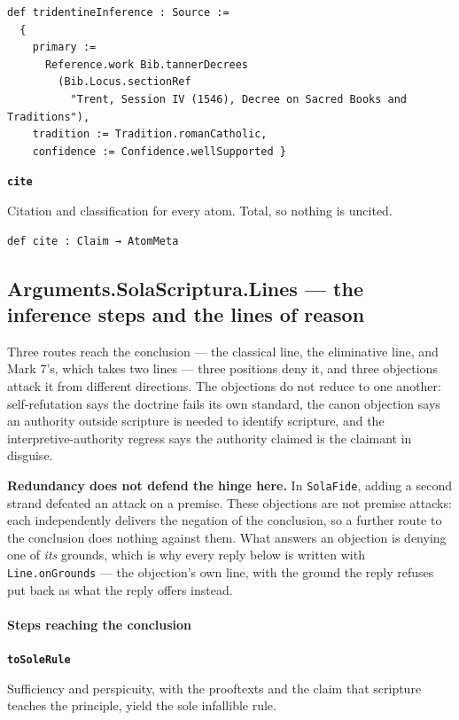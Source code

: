\documentclass[11pt]{article}
\begin{document}
{\small\begin{verbatim}
def tridentineInference : Source :=
  {
    primary :=
      Reference.work Bib.tannerDecrees
        (Bib.Locus.sectionRef
          "Trent, Session IV (1546), Decree on Sacred Books and Traditions"),
    tradition := Tradition.romanCatholic,
    confidence := Confidence.wellSupported }
\end{verbatim}}
\par\medskip\noindent\textbf{\texttt{cite}}\par\nobreak\noindent
Citation and classification for every atom. Total, so nothing is uncited.

{\small\begin{verbatim}
def cite : Claim → AtomMeta
\end{verbatim}}
\subsection*{Arguments.SolaScriptura.Lines — the inference steps and the lines of reason}
Three routes reach the conclusion — the classical line, the eliminative line, and Mark 7's, which takes two lines — three positions deny it, and three objections attack it from different directions. The objections do not reduce to one another: self-refutation says the doctrine fails its own standard, the canon objection says an authority outside scripture is needed to identify scripture, and the interpretive-authority regress says the authority claimed is the claimant in disguise.

\textbf{Redundancy does not defend the hinge here.} In \texttt{Sola\allowbreak{}Fide}, adding a second strand defeated an attack on a premise. These objections are not premise attacks: each independently delivers the negation of the conclusion, so a further route to the conclusion does nothing against them. What answers an objection is denying one of \emph{its} grounds, which is why every reply below is written with \texttt{Line.on\allowbreak{}Grounds} — the objection's own line, with the ground the reply refuses put back as what the reply offers instead.

\paragraph*{Steps reaching the conclusion}
\leavevmode\par
\par\medskip\noindent\textbf{\texttt{to\allowbreak{}Sole\allowbreak{}Rule}}\par\nobreak\noindent
Sufficiency and perspicuity, with the prooftexts and the claim that scripture teaches the principle, yield the sole infallible rule.
\end{document}
